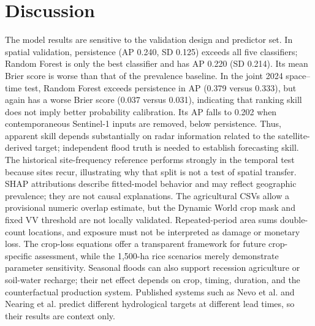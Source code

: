 \documentclass[pdflatex,sn-mathphys,Numbered]{sn-jnl}
\begin{document}
\section{Discussion}
The model results are sensitive to the validation design and predictor set. In spatial validation, persistence (AP 0.240, SD 0.125) exceeds all five classifiers; Random Forest is only the best classifier and has AP 0.220 (SD 0.214). Its mean Brier score is worse than that of the prevalence baseline. In the joint 2024 space--time test, Random Forest exceeds persistence in AP (0.379 versus 0.333), but again has a worse Brier score (0.037 versus 0.031), indicating that ranking skill does not imply better probability calibration. Its AP falls to 0.202 when contemporaneous Sentinel-1 inputs are removed, below persistence. Thus, apparent skill depends substantially on radar information related to the satellite-derived target; independent flood truth is needed to establish forecasting skill. The historical site-frequency reference performs strongly in the temporal test because sites recur, illustrating why that split is not a test of spatial transfer. SHAP attributions describe fitted-model behavior and may reflect geographic prevalence; they are not causal explanations. The agricultural CSVs allow a provisional numeric overlap estimate, but the Dynamic World crop mask and fixed VV threshold are not locally validated. Repeated-period area sums double-count locations, and exposure must not be interpreted as damage or monetary loss. The crop-loss equations offer a transparent framework for future crop-specific assessment, while the 1,500-ha rice scenarios merely demonstrate parameter sensitivity. Seasonal floods can also support recession agriculture or soil-water recharge; their net effect depends on crop, timing, duration, and the counterfactual production system. Published systems such as Nevo et al. and Nearing et al. predict different hydrological targets at different lead times, so their results are context only.
\end{document}
